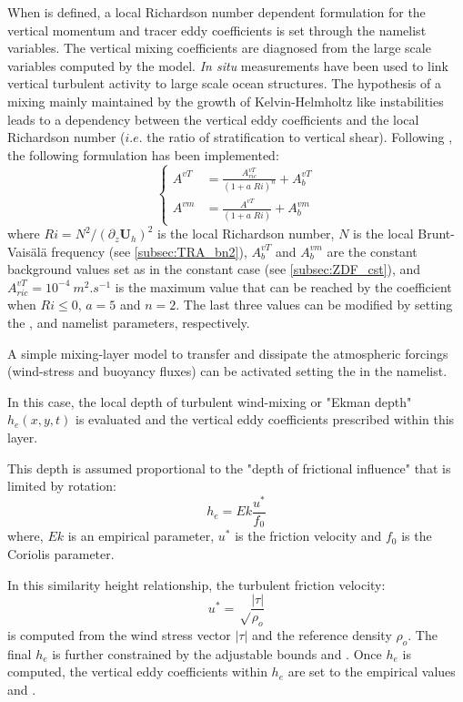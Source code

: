 \documentclass[../main/NEMO_manual]{subfiles}
\begin{document}
When  is defined, a local Richardson number dependent formulation for the vertical momentum and
tracer eddy coefficients is set through the  namelist variables.
The vertical mixing coefficients are diagnosed from the large scale variables computed by the model. 
\textit{In situ} measurements have been used to link vertical turbulent activity to large scale ocean structures.
The hypothesis of a mixing mainly maintained by the growth of Kelvin-Helmholtz like instabilities leads to
a dependency between the vertical eddy coefficients and the local Richardson number
($i.e.$ the ratio of stratification to vertical shear).
Following \citet{Pacanowski_Philander_JPO81}, the following formulation has been implemented:
\[
  \left\{
    \begin{aligned}
      A^{vT} &= \frac {A_{ric}^{vT}}{\left( 1+a \; Ri \right)^n} + A_b^{vT}       \\
      A^{vm} &= \frac{A^{vT}        }{\left( 1+ a \;Ri  \right)   } + A_b^{vm}
    \end{aligned}
  \right.
\]
where $Ri = N^2 / \left(\partial_z \textbf{U}_h \right)^2$ is the local Richardson number,
$N$ is the local Brunt-Vais\"{a}l\"{a} frequency (see \autoref{subsec:TRA_bn2}), 
$A_b^{vT} $ and $A_b^{vm}$ are the constant background values set as in the constant case
(see \autoref{subsec:ZDF_cst}), and $A_{ric}^{vT} = 10^{-4}~m^2.s^{-1}$ is the maximum value that
can be reached by the coefficient when $Ri\leq 0$, $a=5$ and $n=2$.
The last three values can be modified by setting the ,  and
 namelist parameters, respectively.

A simple mixing-layer model to transfer and dissipate the atmospheric forcings
(wind-stress and buoyancy fluxes) can be activated setting the  in the namelist.

In this case, the local depth of turbulent wind-mixing or "Ekman depth" $h_{e}(x,y,t)$ is evaluated and
the vertical eddy coefficients prescribed within this layer.

This depth is assumed proportional to the "depth of frictional influence" that is limited by rotation:
\[
  h_{e} = Ek \frac {u^{*}} {f_{0}}
\]
where, $Ek$ is an empirical parameter, $u^{*}$ is the friction velocity and $f_{0}$ is the Coriolis parameter.

In this similarity height relationship, the turbulent friction velocity:
\[
  u^{*} = \sqrt \frac {|\tau|} {\rho_o}
\]
is computed from the wind stress vector $|\tau|$ and the reference density $ \rho_o$.
The final $h_{e}$ is further constrained by the adjustable bounds  and .
Once $h_{e}$ is computed, the vertical eddy coefficients within $h_{e}$ are set to
the empirical values  and  \citep{Lermusiaux2001}.
\end{document}
